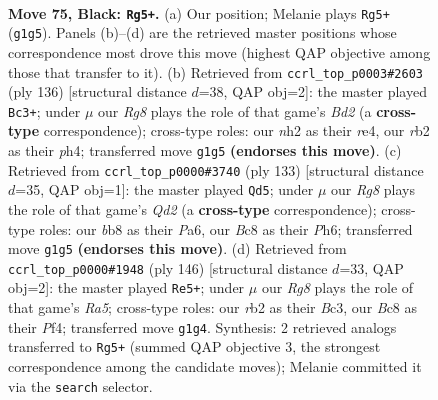 \documentclass[11pt]{article}
\begin{document}
\clearpage

\begin{figure}[p]\centering
\begin{subfigure}{0.46\textwidth}\centering
\resizebox{\linewidth}{!}{%
\newchessgame
\chessboard[
  setfen={1Bb5/4k3/8/2K5/PP6/5B1p/1R5N/6r1 b - - 8 75},
  showmover=false,
  pgfstyle=straightmove, color=movearrow, markmove={g1-g5}
]}
\caption{}
\end{subfigure}\hfill
\begin{subfigure}{0.46\textwidth}\centering
\resizebox{\linewidth}{!}{%
\newchessgame
\chessboard[
  setfen={8/4b1k1/1R6/5p2/4r2p/7P/3B2P1/5K2 w - - 12 69},
  showmover=false,
  pgfstyle=straightmove, color=movearrow, markmove={d2-c3}
]}
\caption{}
\end{subfigure}
\\[4pt]
\begin{subfigure}{0.46\textwidth}\centering
\resizebox{\linewidth}{!}{%
\newchessgame
\chessboard[
  setfen={8/3q4/p4k1p/2B5/8/P1R2NK1/8/8 b - - 9 67},
  showmover=false,
  pgfstyle=straightmove, color=movearrow, markmove={d7-d5}
]}
\caption{}
\end{subfigure}\hfill
\begin{subfigure}{0.46\textwidth}\centering
\resizebox{\linewidth}{!}{%
\newchessgame
\chessboard[
  setfen={8/1p2r2p/2b1k2P/R7/5P2/2B5/5K2/8 w - - 19 74},
  showmover=false,
  pgfstyle=straightmove, color=movearrow, markmove={a5-e5}
]}
\caption{}
\end{subfigure}
\caption{\textbf{Move 75, Black: \texttt{Rg5+}.} (a) Our position; Melanie plays \texttt{Rg5+} (\texttt{g1g5}). Panels (b)--(d) are the retrieved master positions whose correspondence most drove this move (highest QAP objective among those that transfer to it). (b) Retrieved from \texttt{ccrl\_top\_p0003\#2603} (ply 136) [structural distance $d$=38, QAP obj=2]: the master played \texttt{Bc3+}; under $\mu$ our \emph{Rg8} plays the role of that game's \emph{Bd2} (a \textbf{cross-type} correspondence); cross-type roles: our \emph{n}h2 as their \emph{r}e4, our \emph{r}b2 as their \emph{p}h4; transferred move \texttt{g1g5} \textbf{(endorses this move)}. (c) Retrieved from \texttt{ccrl\_top\_p0000\#3740} (ply 133) [structural distance $d$=35, QAP obj=1]: the master played \texttt{Qd5}; under $\mu$ our \emph{Rg8} plays the role of that game's \emph{Qd2} (a \textbf{cross-type} correspondence); cross-type roles: our \emph{b}b8 as their \emph{P}a6, our \emph{B}c8 as their \emph{P}h6; transferred move \texttt{g1g5} \textbf{(endorses this move)}. (d) Retrieved from \texttt{ccrl\_top\_p0000\#1948} (ply 146) [structural distance $d$=33, QAP obj=2]: the master played \texttt{Re5+}; under $\mu$ our \emph{Rg8} plays the role of that game's \emph{Ra5}; cross-type roles: our \emph{r}b2 as their \emph{B}c3, our \emph{B}c8 as their \emph{P}f4; transferred move \texttt{g1g4}. Synthesis: 2 retrieved analogs transferred to \texttt{Rg5+} (summed QAP objective 3, the strongest correspondence among the candidate moves); Melanie committed it via the \texttt{search} selector.}
\label{fig:thought-m149}
\end{figure}
\end{document}
